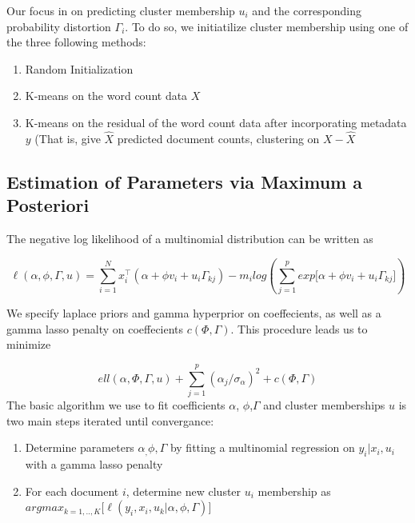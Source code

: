 \documentclass[12pt]{article}
\begin{document}
Our focus in on predicting cluster membership $u_i$ and the
corresponding probability distortion $\Gamma_i$. To do so, we
initiatilize cluster membership using one of the three following
methods:

\begin{enumerate}
\def\labelenumi{\arabic{enumi}.}
\itemsep1pt\parskip0pt
\item
  Random Initialization
\item
  K-means on the word count data $X$
\item
  K-means on the residual of the word count data after incorporating
  metadata $y$ (That is, give $\hat{X}$ predicted document counts,
  clustering on $X-\hat{X}$
\end{enumerate}

\subsection{Estimation of Parameters via Maximum a
Posteriori}\label{estimation-of-parameters-via-maximum-a-posteriori}

The negative log likelihood of a multinomial distribution can be written
as

\begin{equation} 
\ell(\alpha,\phi,\Gamma,u) = \sum_{i = 1}^{N}{ x_i^\top (\alpha + \phi v_i + u_i \Gamma_{kj})} - m_i log(\sum_{j = 1}^{p}{exp{\big[ \alpha + \phi v_i + u_i \Gamma_{kj} \big]}})
\end{equation}

We specify laplace priors and gamma hyperprior on coeffecients, as well
as a gamma lasso penalty on coeffecients $c(\Phi,\Gamma)$. This
procedure leads us to minimize

\begin{equation}
ell(\alpha,\Phi,\Gamma,u) + \sum_{j=1}^{p}(\alpha_j/ \sigma_\alpha)^2 + c(\Phi,\Gamma) 
\end{equation}
The basic algorithm we use to fit coefficients $\alpha$, $\phi$,$\Gamma$
and cluster memberships $u$ is two main steps iterated until
convergance:

\begin{enumerate}
\def\labelenumi{\arabic{enumi}.}
\item
  Determine parameters $\alpha_, \phi, \Gamma$ by fitting a multinomial
  regression on $y_i | x_i , u_i$ with a gamma lasso penalty
\item
  For each document $i$, determine new cluster $u_i$ membership as
  $argmax_{k = 1,..,K} \big[  \ell(y_i,x_i,u_k | \alpha, \phi, \Gamma) \big]$
\end{enumerate}
\end{document}
